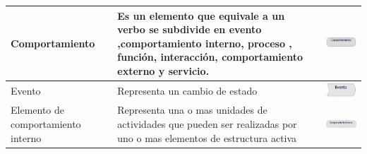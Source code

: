\begin{table}[h!]
\begin{tabular}{| m{7em} | m{7cm} | m{3cm} |}
		\hline
		
		Comportamiento
		& 
		Es un elemento que equivale a un verbo se  subdivide en evento ,comportamiento interno, proceso , función, interacción, comportamiento externo y servicio.
		& \includegraphics[width=0.8\linewidth, height=0.05\textheight]{imgs/conceptos/meta/Comportamiento.PNG}
		\\
		
		\hline
		Evento
		&
		Representa un cambio de estado 
		& \includegraphics[width=0.8\linewidth, height=0.05\textheight]{imgs/conceptos/meta/Evento.PNG}
		\\
		
		\hline
		Elemento de comportamiento interno 
		& 
		Representa una o mas unidades de actividades que pueden ser realizadas por uno o mas elementos de estructura activa
		& \includegraphics[width=0.8\linewidth, height=0.05\textheight]{imgs/conceptos/meta/ComportamientoInterno.PNG}
		\\	\hline
	\end{tabular}
	\label{tab:concepts}
\end{table}

